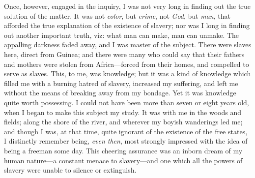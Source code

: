 Once, however, engaged in the inquiry, I was not very long in finding
out the true solution of the matter. It was not \emph{color}, but
\emph{crime}, not \emph{God}, but \emph{man}, that afforded the true
explanation of the existence of slavery; nor was I long in finding out
another important truth, viz: what man can make, man can unmake. The
appalling darkness faded away, and I was master of the subject. There
were slaves here, {\protect\hypertarget{91}{}{}}direct from Guinea; and
there were many who could say that their fathers and mothers were stolen
from Africa---forced from their homes, and compelled to serve as slaves.
This, to me, was knowledge; but it was a kind of knowledge which filled
me with a burning hatred of slavery, increased my suffering, and left me
without the means of breaking away from my bondage. Yet it was knowledge
quite worth possessing. I could not have been more than seven or eight
years old, when I began to make this subject my study. It was with me in
the woods and fields; along the shore of the river, and wherever my
boyish wanderings led me; and though I was, at that time, quite ignorant
of the existence of the free states, I distinctly remember being,
\emph{even then}, most strongly impressed with the idea of being a
freeman some day. This cheering assurance was an inborn dream of my
human nature---a constant menace to slavery---and one which all the
powers of slavery were unable to silence or extinguish.

